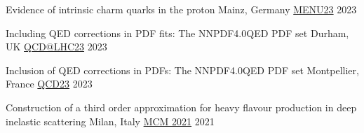 \begin{cvhonors}

    \cvhonor
    {Evidence of intrinsic charm quarks in the proton} %
    {Mainz, Germany}
    {\href{https://indico.him.uni-mainz.de/event/171/}{MENU23}} %
    {2023}

    \cvhonor
    {Including QED corrections in PDF fits: The NNPDF4.0QED PDF set} %
    {Durham, UK}
    {\href{https://conference.ippp.dur.ac.uk/event/1128/}{QCD@LHC23}} %
    {2023}

    \cvhonor
    {Inclusion of QED corrections in PDFs: The NNPDF4.0QED PDF set} %
    {Montpellier, France}
    {\href{https://qcd23.sciencesconf.org/}{QCD23}} %
    {2023}

    \cvhonor
    {Construction of a third order approximation for heavy flavour production in deep inelastic scattering} %
    {Milan, Italy}
    {\href{https://indico.cern.ch/event/1095418/}{MCM 2021}} %
    {2021}
    
    


\end{cvhonors}